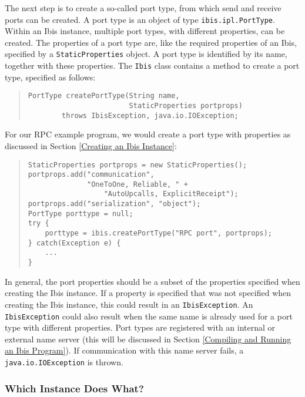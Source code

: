\documentclass[10pt]{article}
\begin{document}
The next step is to create a so-called port type, from which
send and receive ports can be created. A port type is an object
of type \verb+ibis.ipl.PortType+.
Within an Ibis instance,
multiple port types, with different properties, can be created.
The properties of a port type are, like the required properties
of an Ibis, specified by a \verb+StaticProperties+ object.
A port type is identified by its name, together with these properties.
The \verb+Ibis+ class contains a method to create a port type,
specified as follows:
\begin{quote}
\begin{verbatim}
PortType createPortType(String name,
                        StaticProperties portprops)
        throws IbisException, java.io.IOException;
\end{verbatim}
\end{quote}

For our RPC example program, we would create a port type with properties
as discussed in Section \ref{Creating an Ibis Instance}:

\begin{quote}
\begin{verbatim}
StaticProperties portprops = new StaticProperties();
portprops.add("communication",
              "OneToOne, Reliable, " + 
                  "AutoUpcalls, ExplicitReceipt");
portprops.add("serialization", "object");
PortType porttype = null;
try {
    porttype = ibis.createPortType("RPC port", portprops);
} catch(Exception e) {
    ...
}
\end{verbatim}
\end{quote}

In general, the port properties should be a subset of the properties
specified when creating the Ibis instance. If a property is specified
that was not specified when creating the Ibis instance, this could
result in an \verb+IbisException+.
An \verb+IbisException+ could also result when the same name is
already used for a port type with different properties.
Port types are registered with an internal or external name server
(this will be discussed in Section \ref{Compiling and Running an Ibis Program}).
If communication with this name server fails, a
\verb+java.io.IOException+ is thrown.

\subsubsection{Which Instance Does What?}
\end{document}
